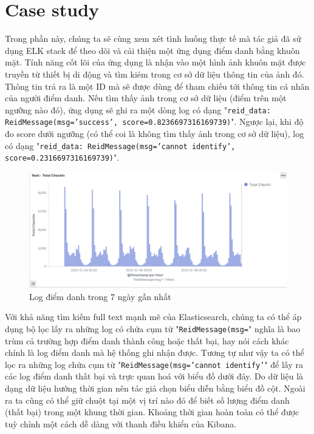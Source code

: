 \section{Case study}
Trong phần này, chúng ta sẽ cùng xem xét tình huống thực tế mà tác giả đã sử dụng ELK stack để theo dõi và cải thiện một ứng dụng điểm danh bằng khuôn mặt. Tính năng cốt lõi của ứng dụng là nhận vào một hình ảnh khuôn mặt được truyền từ thiết bị di động và tìm kiém trong cơ sở dữ liệu thông tin của ảnh đó. Thông tin trả ra là một ID mà sẽ được dùng để tham chiếu tới thông tin cá nhân của người điểm danh. Nếu tìm thấy ảnh trong cơ sở dữ liệu (điểm trên một ngưỡng nào đó), ứng dụng sẽ ghi ra một dòng log có dạng "\texttt{reid\_data: ReidMessage(msg='success', score=0.8236697316169739)}". Ngược lại, khi độ đo score dưới ngưỡng (có thể coi là không tìm thấy ảnh trong cơ sở dữ liệu), log có dạng "\texttt{reid\_data: ReidMessage(msg='cannot identify', 
 \\ score=0.2316697316169739)}". 

 \begin{figure}[H] %
    \centering %
    \includegraphics[width=1\textwidth]{figures/total_checkin.png} 
    \caption{Log điểm danh trong 7 ngày gần nhất} %
    \label{fig:elk_01}
\end{figure}

Với khả năng tìm kiếm full text mạnh mẽ của Elasticsearch, chúng ta có thể áp dụng bộ lọc lấy ra những log có chứa cụm từ "\texttt{ReidMessage(msg=}" nghĩa là bao trùm cả trường hợp điểm danh thành công hoặc thất bại, hay nói cách khác chính là log điểm danh mà hệ thống ghi nhận được. Tương tự như vậy ta có thể lọc ra những log chứa cụm từ "\texttt{ReidMessage(msg='cannot identify'}" để lấy ra các log điểm danh thất bại và trực quan hoá với biểu đồ dưới đây. Do dữ liệu là dạng dữ liệu hướng thời gian nên tác giả chọn biểu diễn bằng biểu đồ cột. Ngoài ra ta cũng có thể giữ chuột tại một vị trí nào đó để biết số lượng điểm danh (thất bại) trong một khung thời gian. Khoảng thời gian hoàn toàn có thể được tuỳ chỉnh một cách dễ dàng với thanh điều khiển của Kibana.

